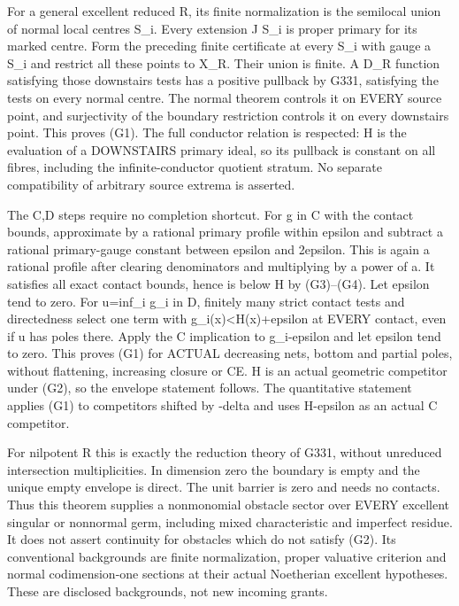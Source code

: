 \documentclass[11pt]{article}
\begin{document}
For a general excellent reduced R, its finite normalization is the semilocal union of normal local centres S\_i. Every extension J S\_i is proper primary for its marked centre. Form the preceding finite certificate at every S\_i with gauge a S\_i and restrict all these points to X\_R. Their union is finite. A D\_R function satisfying those downstairs tests has a positive pullback by G331, satisfying the tests on every normal centre. The normal theorem controls it on EVERY source point, and surjectivity of the boundary restriction controls it on every downstairs point. This proves (G1). The full conductor relation is respected: H is the evaluation of a DOWNSTAIRS primary ideal, so its pullback is constant on all fibres, including the infinite-conductor quotient stratum. No separate compatibility of arbitrary source extrema is asserted.

The C,D steps require no completion shortcut. For g in C with the contact bounds, approximate by a rational primary profile within epsilon and subtract a rational primary-gauge constant between epsilon and 2epsilon. This is again a rational profile after clearing denominators and multiplying by a power of a. It satisfies all exact contact bounds, hence is below H by (G3)--(G4). Let epsilon tend to zero. For u=inf\_i g\_i in D, finitely many strict contact tests and directedness select one term with g\_i(x)<H(x)+epsilon at EVERY contact, even if u has poles there. Apply the C implication to g\_i-epsilon and let epsilon tend to zero. This proves (G1) for ACTUAL decreasing nets, bottom and partial poles, without flattening, increasing closure or CE. H is an actual geometric competitor under (G2), so the envelope statement follows. The quantitative statement applies (G1) to competitors shifted by -delta and uses H-epsilon as an actual C competitor.

For nilpotent R this is exactly the reduction theory of G331, without unreduced intersection multiplicities. In dimension zero the boundary is empty and the unique empty envelope is direct. The unit barrier is zero and needs no contacts. Thus this theorem supplies a nonmonomial obstacle sector over EVERY excellent singular or nonnormal germ, including mixed characteristic and imperfect residue. It does not assert continuity for obstacles which do not satisfy (G2). Its conventional backgrounds are finite normalization, proper valuative criterion and normal codimension-one sections at their actual Noetherian excellent hypotheses. These are disclosed backgrounds, not new incoming grants.
\end{document}
